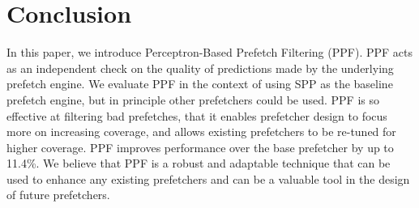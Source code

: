 \section{Conclusion}
\label{Conclusion}
In this paper, we introduce Perceptron-Based Prefetch Filtering (PPF). PPF 
acts as an independent check on the quality of predictions made by the
underlying prefetch engine.  We evaluate PPF in the context of using SPP
as the baseline prefetch engine, but in principle other prefetchers could
be used.  PPF is so effective at filtering bad prefetches, that it enables
prefetcher design to focus more on increasing coverage, and allows existing
prefetchers to be re-tuned for higher coverage.  PPF improves performance 
over the base prefetcher by up to 11.4\%. We believe that PPF is a robust
and adaptable technique that can be used to enhance any existing prefetchers
and can be a valuable tool in the design of future prefetchers.
